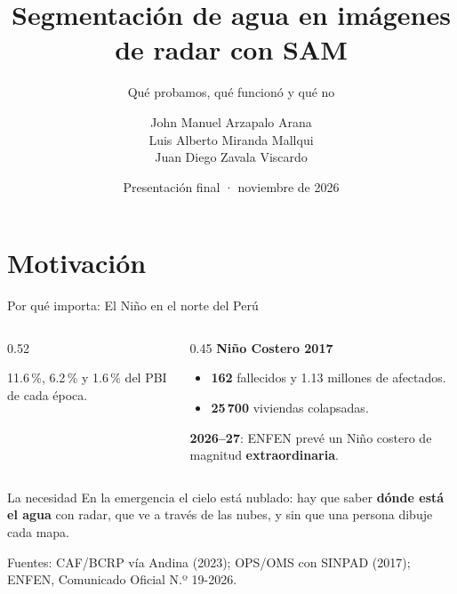 \documentclass[10pt,aspectratio=1610]{beamer}
\title[SAM sobre radar · la historia completa]{Segmentación de agua en imágenes de radar con SAM}
\subtitle{Qué probamos, qué funcionó y qué no}
\author[Arzapalo · Miranda · Zavala]{John Manuel Arzapalo Arana\\ Luis Alberto Miranda Mallqui\\ Juan Diego Zavala Viscardo}
\institute{INF659 · Técnicas Avanzadas de Data Mining y Sistemas Inteligentes\\ Pontificia Universidad Católica del Perú}
\date{Presentación final · noviembre de 2026}
\newcommand{\fuente}[1]{\par\vfill{\tiny\color{gray}#1}}
\begin{document}
\begin{frame}
  \titlepage
\end{frame}

\section{Motivación}

\begin{frame}{Por qué importa: El Niño en el norte del Perú}
  \begin{columns}[T]
    \begin{column}{0.52\textwidth}
      {\tiny 11.6\,\%, 6.2\,\% y 1.6\,\% del PBI de cada época.}
    \end{column}
    \begin{column}{0.45\textwidth}
      \small
      \textbf{Niño Costero 2017}
      \begin{itemize}
        \item \textbf{162} fallecidos y 1.13 millones de afectados.
        \item \textbf{25\,700} viviendas colapsadas.
      \end{itemize}
      \textbf{2026--27}: ENFEN prevé un Niño costero de magnitud \textbf{extraordinaria}.
    \end{column}
  \end{columns}
  \begin{block}{La necesidad}
    En la emergencia el cielo está nublado: hay que saber \textbf{dónde está el agua} con radar, que ve a través de las nubes, y sin que una persona dibuje cada mapa.
  \end{block}
  \fuente{Fuentes: CAF/BCRP vía Andina (2023); OPS/OMS con SINPAD (2017); ENFEN, Comunicado Oficial N.º 19-2026.}
\end{frame}
\end{document}
